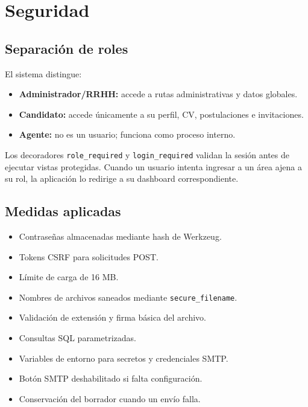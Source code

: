\documentclass[12pt,a4paper]{article}
\begin{document}
\section{Seguridad}

\subsection{Separación de roles}

El sistema distingue:

\begin{itemize}[leftmargin=*]
    \item \textbf{Administrador/RRHH:} accede a rutas administrativas y datos globales.
    \item \textbf{Candidato:} accede únicamente a su perfil, CV, postulaciones e invitaciones.
    \item \textbf{Agente:} no es un usuario; funciona como proceso interno.
\end{itemize}

Los decoradores \texttt{role\_required} y \texttt{login\_required} validan la sesión antes de ejecutar vistas protegidas. Cuando un usuario intenta ingresar a un área ajena a su rol, la aplicación lo redirige a su dashboard correspondiente.

\subsection{Medidas aplicadas}

\begin{itemize}[leftmargin=*]
    \item Contraseñas almacenadas mediante hash de Werkzeug.
    \item Tokens CSRF para solicitudes POST.
    \item Límite de carga de 16 MB.
    \item Nombres de archivos saneados mediante \texttt{secure\_filename}.
    \item Validación de extensión y firma básica del archivo.
    \item Consultas SQL parametrizadas.
    \item Variables de entorno para secretos y credenciales SMTP.
    \item Botón SMTP deshabilitado si falta configuración.
    \item Conservación del borrador cuando un envío falla.
\end{itemize}
\end{document}
